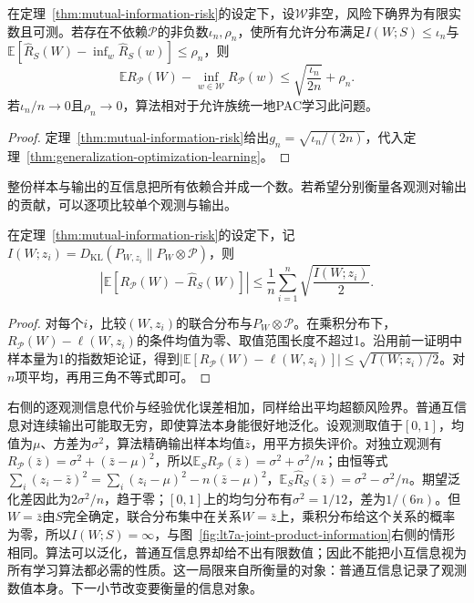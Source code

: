 \begin{theorem}[互信息稳定性与可学习性]
\label{thm:mutual-information-learning}
在定理~\ref{thm:mutual-information-risk}的设定下，设$\mathcal W$非空，风险下确界为有限实数且可测。若存在不依赖$\mathcal P$的非负数$\iota_n,\rho_n$，使所有允许分布满足$I(W;S)\leq\iota_n$与$\mathbb E[\hat R_S(W)-\inf_w\hat R_S(w)]\leq\rho_n$，则
\[
 \mathbb E R_{\mathcal P}(W)-\inf_{w\in\mathcal W}R_{\mathcal P}(w)\leq\sqrt{\frac{\iota_n}{2n}}+\rho_n.
\]
若$\iota_n/n\to0$且$\rho_n\to0$，算法相对于允许族统一地PAC学习此问题。
\end{theorem}
\begin{proof}
定理~\ref{thm:mutual-information-risk}给出$g_n=\sqrt{\iota_n/(2n)}$，代入定理~\ref{thm:generalization-optimization-learning}。
\end{proof}

整份样本与输出的互信息把所有依赖合并成一个数。若希望分别衡量各观测对输出的贡献，可以逐项比较单个观测与输出。

\begin{theorem}[逐观测互信息的期望风险界]
\label{thm:individual-information-risk}
在定理~\ref{thm:mutual-information-risk}的设定下，记$I(W;z_i)=D_{\mathrm{KL}}(P_{W,z_i}\|P_W\otimes\mathcal P)$，则
\[
 \left|\mathbb E[R_{\mathcal P}(W)-\hat R_S(W)]\right|\leq\frac1n\sum_{i=1}^n\sqrt{\frac{I(W;z_i)}2}.
\]
\end{theorem}
\begin{proof}
对每个$i$，比较$(W,z_i)$的联合分布与$P_W\otimes\mathcal P$。在乘积分布下，$R_{\mathcal P}(W)-\ell(W,z_i)$的条件均值为零、取值范围长度不超过1。沿用前一证明中样本量为1的指数矩论证，得到$|\mathbb E[R_{\mathcal P}(W)-\ell(W,z_i)]|\leq\sqrt{I(W;z_i)/2}$。对$n$项平均，再用三角不等式即可。
\end{proof}

右侧的逐观测信息代价与经验优化误差相加，同样给出平均超额风险界。普通互信息对连续输出可能取无穷，即使算法本身能很好地泛化。设观测取值于$[0,1]$，均值为$\mu$、方差为$\sigma^2$，算法精确输出样本均值$\bar z$，用平方损失评价。对独立观测有$R_{\mathcal P}(\bar z)=\sigma^2+(\bar z-\mu)^2$，所以$\mathbb E_SR_{\mathcal P}(\bar z)=\sigma^2+\sigma^2/n$；由恒等式$\sum_i(z_i-\bar z)^2=\sum_i(z_i-\mu)^2-n(\bar z-\mu)^2$，$\mathbb E_S\hat R_S(\bar z)=\sigma^2-\sigma^2/n$。期望泛化差因此为$2\sigma^2/n$，趋于零；$[0,1]$上的均匀分布有$\sigma^2=1/12$，差为$1/(6n)$。但$W=\bar z$由$S$完全确定，联合分布集中在关系$W=\bar z$上，乘积分布给这个关系的概率为零，所以$I(W;S)=\infty$，与图~\ref{fig:lt7a-joint-product-information}右侧的情形相同。算法可以泛化，普通互信息界却给不出有限数值；因此不能把小互信息视为所有学习算法都必需的性质。这一局限来自所衡量的对象：普通互信息记录了观测数值本身。下一小节改变要衡量的信息对象。

